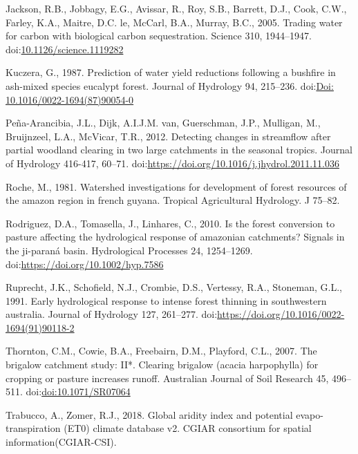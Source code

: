 \documentclass[]{elsarticle} %
\newlength{\cslhangindent}
\newlength{\cslentryspacingunit} %
\newenvironment{CSLReferences}[2] %
 {%
  \setlength{\parindent}{0pt}
  \ifodd #1
  \let\oldpar\par
  \def\par{\hangindent=\cslhangindent\oldpar}
  \fi
  \setlength{\parskip}{#2\cslentryspacingunit}
 }%
 {}
\begin{document}
\begin{CSLReferences}{1}{0}
\leavevmode{}%
Jackson, R.B., Jobbagy, E.G., Avissar, R., Roy, S.B., Barrett, D.J., Cook, C.W., Farley, K.A., Maitre, D.C. le, McCarl, B.A., Murray, B.C., 2005. Trading water for carbon with biological carbon sequestration. Science 310, 1944--1947. doi:\href{https://doi.org/10.1126/science.1119282}{10.1126/science.1119282}

\leavevmode{}%
Kuczera, G., 1987. Prediction of water yield reductions following a bushfire in ash-mixed species eucalypt forest. Journal of Hydrology 94, 215--236. doi:\href{https://doi.org/Doi:\%2010.1016/0022-1694(87)90054-0}{Doi: 10.1016/0022-1694(87)90054-0}

\leavevmode{}%
Peña-Arancibia, J.L., Dijk, A.I.J.M. van, Guerschman, J.P., Mulligan, M., Bruijnzeel, L.A., McVicar, T.R., 2012. Detecting changes in streamflow after partial woodland clearing in two large catchments in the seasonal tropics. Journal of Hydrology 416-417, 60--71. doi:\url{https://doi.org/10.1016/j.jhydrol.2011.11.036}

\leavevmode{}%
Roche, M., 1981. Watershed investigations for development of forest resources of the amazon region in french guyana. Tropical Agricultural Hydrology. J 75--82.

\leavevmode{}%
Rodriguez, D.A., Tomasella, J., Linhares, C., 2010. Is the forest conversion to pasture affecting the hydrological response of amazonian catchments? Signals in the ji-paraná basin. Hydrological Processes 24, 1254--1269. doi:\url{https://doi.org/10.1002/hyp.7586}

\leavevmode{}%
Ruprecht, J.K., Schofield, N.J., Crombie, D.S., Vertessy, R.A., Stoneman, G.L., 1991. Early hydrological response to intense forest thinning in southwestern australia. Journal of Hydrology 127, 261--277. doi:\url{https://doi.org/10.1016/0022-1694(91)90118-2}

\leavevmode{}%
Thornton, C.M., Cowie, B.A., Freebairn, D.M., Playford, C.L., 2007. The brigalow catchment study: II*. Clearing brigalow (acacia harpophylla) for cropping or pasture increases runoff. Australian Journal of Soil Research 45, 496--511. doi:\href{https://doi.org/doi:10.1071/SR07064}{doi:10.1071/SR07064}

\leavevmode{}%
Trabucco, A., Zomer, R.J., 2018. Global aridity index and potential evapo-transpiration (ET0) climate database v2. CGIAR consortium for spatial information(CGIAR-CSI).


\end{CSLReferences}
\end{document}
